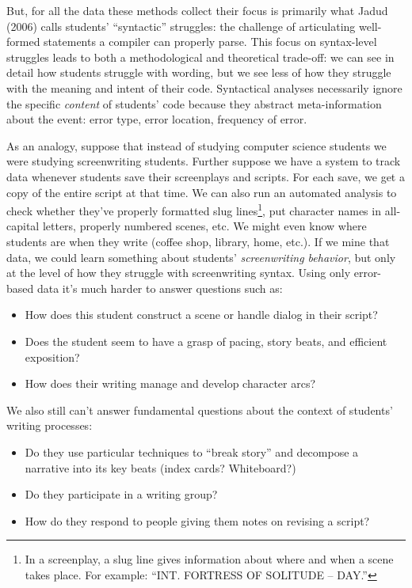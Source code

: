 But, for all the data these methods collect their focus is primarily
what Jadud (2006) calls students' ``syntactic'' struggles: the challenge
of articulating well-formed statements a compiler can properly parse.
This focus on syntax-level struggles leads to both a methodological and
theoretical trade-off: we can see in detail how students struggle with
wording, but we see less of how they struggle with the meaning and
intent of their code. Syntactical analyses necessarily ignore the
specific \emph{content} of students' code because they abstract
meta-information about the event: error type, error location, frequency
of error.

As an analogy, suppose that instead of studying computer science
students we were studying screenwriting students. Further suppose we
have a system to track data whenever students save their screenplays and
scripts. For each save, we get a copy of the entire script at that time.
We can also run an automated analysis to check whether they've properly
formatted slug lines\footnote{In a screenplay, a slug line gives
  information about where and when a scene takes place. For example:
  ``INT. FORTRESS OF SOLITUDE -- DAY.''}, put character names in
all-capital letters, properly numbered scenes, etc. We might even know
where students are when they write (coffee shop, library, home, etc.).
If we mine that data, we could learn something about students'
\emph{screenwriting behavior}, but only at the level of how they
struggle with screenwriting syntax. Using only error-based data it's
much harder to answer questions such as:

\begin{itemize}
\item
  How does this student construct a scene or handle dialog in their
  script?
\item
  Does the student seem to have a grasp of pacing, story beats, and
  efficient exposition?
\item
  How does their writing manage and develop character arcs?
\end{itemize}

We also still can't answer fundamental questions about the context of
students' writing processes:

\begin{itemize}
\item
  Do they use particular techniques to ``break story'' and decompose a
  narrative into its key beats (index cards? Whiteboard?)
\item
  Do they participate in a writing group?
\item
  How do they respond to people giving them notes on revising a script?
\end{itemize}


